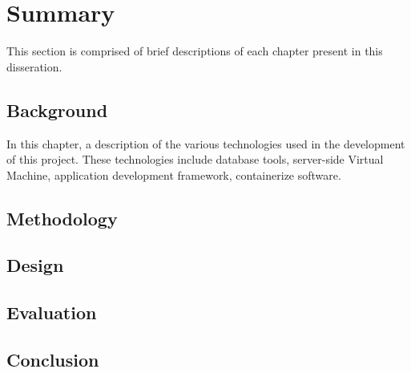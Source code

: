 \section{Summary}
This section is comprised of brief descriptions of each chapter present in this disseration.

\subsection{Background}
In this chapter, a description of the various technologies used in the development of this project. These technologies include database tools, server-side Virtual Machine, application development framework, containerize software.
\subsection{Methodology}
\subsection{Design}
\subsection{Evaluation}
\subsection{Conclusion}

